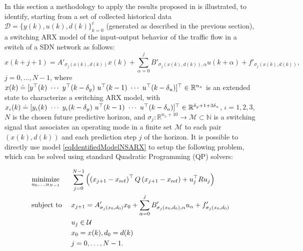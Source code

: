 In this section a methodology to apply the results proposed in \cite{SmarraADHS2018,smarraNAHS2020} is illustrated, to identify, starting from a set of collected historical data $ \mathcal{D}=\{y(k),u(k),d(k)\}_{k = 0}^{\ell} $ (generated as described in the previous section), a switching ARX model of the input-output behavior of the traffic flow in a switch of a SDN network as follows:
\small
\begin{equation}\label{eqIdentifiedModelNSARX}
x(k+j+1) =	A'_{\sigma_j(x(k),d(k))} x(k) + \sum_{\alpha = 0}^{j}B'_{\sigma_{j}(x(k),d(k)),\alpha} u(k+\alpha) + f'_{\sigma_j(x(k),d(k))},
\end{equation}
\normalsize
\noindent $j = 0,\ldots, N-1$, where $x(k) \doteq [y^\top(k)\ \cdots\ y^\top(k-\delta_y)\ u^\top(k-1)\ \cdots\ u^\top(k-\delta_u)]^\top\in\Real^{n_x}$ is an extended state to characterize a switching ARX model, with $x_\iota(k) \doteq [y_\iota(k)\ \cdots\ y_\iota(k-\delta_y)\ u^\top(k-1)\ \cdots\ u^\top(k-\delta_u)]^\top\in\Real^{\delta_y+1+3\delta_u}$, $\iota = 1,2,3$, $N$ is the chosen future predictive horizon, and  $\sigma_j : \mathbb{R}^{n_x+10} \to \mathcal M \subset \mathbb{N}$ is a switching signal that associates an operating mode in a finite set $\mathcal M$ to each pair $(x(k),d(k))$ and each prediction step $j$ of the horizon.
It is possible to directly use model \eqref{eqIdentifiedModelNSARX} to setup the following problem, which can be solved using standard Quadratic Programming (QP) solvers:\\
\begin{problem}\label{pbMPCSwitching}
	\small
	\vspace{-0.3cm}
	\begin{equation*}
		\begin{aligned}
			& \underset{u_0,\ldots,u_{N-1}}{\text{minimize}} & &  \sum_{j=0}^{N-1} \left(\left(x_{j+1}-x_{\mathrm{ref}}\right)^\top Q \left(x_{j+1}-x_{\mathrm{ref}}\right) + u^\top_{j} R u_{j}\right)\\
			& \text{subject to }            & &  x_{j+1} = A'_{\sigma_j(x_{0},d_{0})} x_0 + \sum_{\alpha = 0}^{j}B'_{\sigma_{j}(x_{0},d_{0}),\alpha} u_\alpha + f'_{\sigma_j(x_{0},d_{0})}\\       
			&                               & &  u_{j}   \in \mathcal{U}\\
			&                               & &  x_{0} = x(k), d_{0} = d(k)\\ 
			&                               & &  j = 0,\ldots,N-1.			\\
		\end{aligned}
		\vspace{0.1cm}
	\end{equation*}
	\normalsize
\end{problem}
